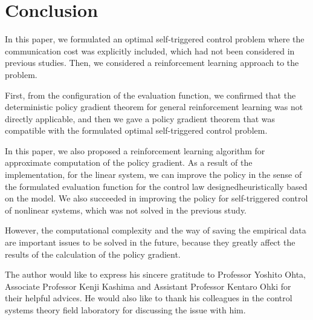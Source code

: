 \documentclass[english, dvipdfmx]{ampmt}             %
\begin{document}
\section{Conclusion}
In this paper, we formulated an optimal self-triggered control problem where the communication cost was explicitly included, which had not been considered in previous studies. Then, we considered a reinforcement learning approach to the problem.  \par
First, from the configuration of the evaluation function, we confirmed that the deterministic policy gradient theorem for general reinforcement learning was not directly applicable, and then we gave a policy gradient theorem that was compatible with the formulated optimal self-triggered control problem. \par
In this paper, we also proposed a reinforcement learning algorithm for approximate computation of the policy gradient. As a result of the implementation, for the linear system, we can improve the policy in the sense of the formulated evaluation function for the control law designedheuristically based on  the model. We also succeeded in improving the policy for self-triggered control of nonlinear systems, which was not solved in the previous study. \par
However, the computational complexity and the way of saving the empirical data are important issues to be solved in the future, because they greatly affect the results of the calculation of the policy gradient.

\acknowledgment
The author would like to express his sincere gratitude to Professor
Yoshito Ohta, Associate Professor Kenji Kashima and Assistant Professor Kentaro Ohki for their helpful advices. He would also like to thank his colleagues in the control systems theory field laboratory for discussing the issue with him.
\end{document}
